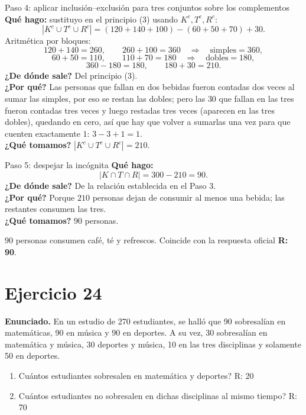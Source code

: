 \documentclass[11pt]{article}
\begin{document}
\begin{sol}
\begin{paso}{Paso 4: aplicar inclusi\'on--exclusi\'on para tres conjuntos sobre los complementos}
\textbf{Qu\'e hago:} sustituyo en el principio (3) usando $K^{c},T^{c},R^{c}$:
\[
|K^{c}\cup T^{c}\cup R^{c}| = (120+140+100) - (60+50+70) + 30 .
\]
Aritm\'etica por bloques:
\[
120+140 = 260, \qquad 260+100 = 360 \quad\Longrightarrow\quad \text{simples} = 360,
\]
\[
60+50 = 110, \qquad 110+70 = 180 \quad\Longrightarrow\quad \text{dobles} = 180,
\]
\[
360 - 180 = 180, \qquad 180 + 30 = 210 .
\]
\textbf{¿De d\'onde sale?} Del principio (3).\\
\textbf{¿Por qu\'e?} Las personas que fallan en dos bebidas fueron contadas dos veces al sumar las simples, por eso se restan las dobles; pero las $30$ que fallan en las tres fueron contadas tres veces y luego restadas tres veces (aparecen en las tres dobles), quedando en cero, as\'i que hay que volver a sumarlas una vez para que cuenten exactamente $1$: $3-3+1=1$.\\
\textbf{¿Qu\'e tomamos?} $|K^{c}\cup T^{c}\cup R^{c}| = 210$.
\end{paso}

\begin{paso}{Paso 5: despejar la inc\'ognita}
\textbf{Qu\'e hago:}
\[
|K\cap T\cap R| = 300 - 210 = 90 .
\]
\textbf{¿De d\'onde sale?} De la relaci\'on establecida en el Paso 3.\\
\textbf{¿Por qu\'e?} Porque $210$ personas dejan de consumir al menos una bebida; las restantes consumen las tres.\\
\textbf{¿Qu\'e tomamos?} $90$ personas.
\end{paso}

\end{sol}

\begin{resp}
$\boxed{90}$ personas consumen caf\'e, t\'e y refrescos. Coincide con la respuesta oficial \textbf{R: 90}.
\end{resp}

\newpage

\section*{Ejercicio 24}

\textbf{Enunciado.} En un estudio de 270 estudiantes, se hall\'o que 90 sobresal\'ian en matem\'aticas, 90 en m\'usica y 90 en deportes. A su vez, 30 sobresal\'ian en matem\'atica y m\'usica, 30 deportes y m\'usica, 10 en las tres disciplinas y solamente 50 en deportes.
\begin{enumerate}[label=(\alph*),leftmargin=*]
\item Cu\'antos estudiantes sobresalen en matem\'atica y deportes? R: 20
\item Cu\'antos estudiantes no sobresalen en dichas disciplinas al mismo tiempo? R: 70
\end{enumerate}
\end{document}
